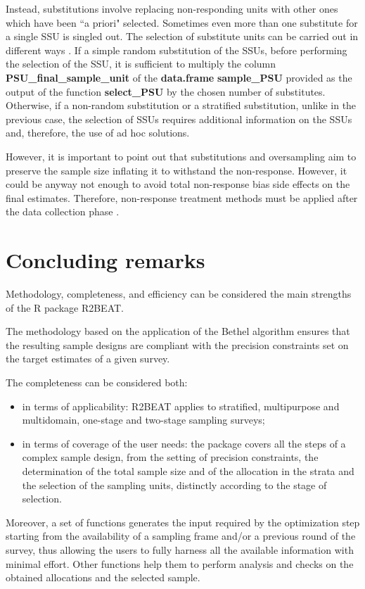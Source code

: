 Instead, substitutions involve replacing non-responding units with other ones which have been ``a priori" selected.
Sometimes even more than one substitute for a single SSU is singled out.
The selection of substitute units can be carried out in different ways \citep[see, for a brief but complete review][]{lynn2004use}. 
If a simple random substitution of the SSUs, before performing the selection of the SSU, it is sufficient to multiply the column \textbf{PSU\_final\_sample\_unit} of the \textbf{data.frame} \textbf{sample\_PSU} provided as the output of the function \textbf{select\_PSU} by the chosen number of substitutes. 
Otherwise, if a non-random substitution or a stratified substitution, unlike in the previous case, the selection of SSUs requires additional information on the SSUs and, therefore, the use of ad hoc solutions. 

However, it is important to point out that substitutions and oversampling aim to preserve the sample size inflating it to withstand the non-response. 
However, it could be anyway not enough to avoid total non-response bias side effects on the final estimates.
Therefore, non-response treatment methods must be applied after the data collection phase \citep[see, e.g.,][]{sarndal2005estimation, little2019statistical}.



\section{Concluding remarks}
Methodology, completeness, and efficiency can be considered the main strengths of the R package R2BEAT. 

The methodology based on the application of the Bethel algorithm ensures that the resulting sample designs
are compliant with the precision constraints set on the target estimates of a given survey.

The completeness can be considered both:
\begin{itemize}
	\item in terms of applicability: R2BEAT applies to stratified, multipurpose and multidomain, one-stage and
two-stage sampling surveys;
	\item in terms of coverage of the user needs: the package covers all the steps of a complex sample design, 
from the setting of precision constraints, the determination of the total sample size and of the allocation in the strata and the selection of the sampling units, distinctly according to the stage of selection.
\end{itemize}
Moreover, a set of functions generates the input required by the optimization step starting from the availability of a sampling frame and/or a previous round of the survey, thus allowing 
the users to fully harness all the available information with minimal effort. Other functions help them to perform analysis and checks on the obtained allocations and the selected sample.

